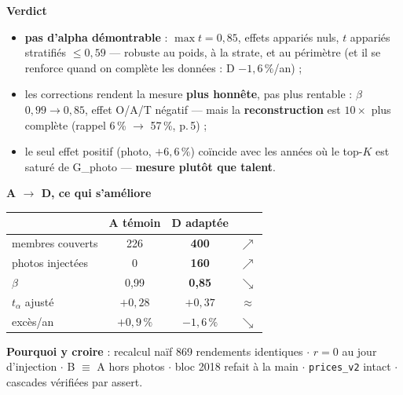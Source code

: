 \documentclass[10pt,a4paper,landscape]{article}
\begin{document}
\noindent\begin{minipage}[t]{0.47\textwidth}\vspace{0pt}
\textbf{\color{rouge}Verdict}
\begin{itemize}
\item[--] \textbf{pas d'alpha démontrable} : $\max t = 0{,}85$, effets appariés nuls, $t$ appariés stratifiés $\le 0{,}59$ --- robuste au poids, à la strate, et au périmètre (et il se renforce quand on complète les données : D $-1{,}6\,\%$/an) ;
\item[--] les corrections rendent la mesure \textbf{plus honnête}, pas plus rentable : $\beta$ $0{,}99 \to 0{,}85$, effet O/A/T négatif --- mais la \textbf{reconstruction} est $10\times$ plus complète (rappel 6\,\% $\to$ 57\,\%, p.\,5) ;
\item[--] le seul effet positif (photo, $+6{,}6\,\%$) coïncide avec les années où le top-$K$ est saturé de G\_photo --- \textbf{mesure plutôt que talent}.
\end{itemize}

\vspace{1mm}
\textbf{A $\to$ D, ce qui s'améliore}
\begin{center}\small
\begin{tabular}{@{}lccc@{}}
\toprule
 & A témoin & D adaptée & \\
\midrule
membres couverts & 226 & \textbf{400} & $\nearrow$ \\
photos injectées & 0 & \textbf{160} & $\nearrow$ \\
$\beta$ & 0,99 & \textbf{0,85} & $\searrow$ \\
$t_{\alpha}$ ajusté & $+0{,}28$ & $+0{,}37$ & $\approx$ \\
excès/an & $+0{,}9\,\%$ & $-1{,}6\,\%$ & $\searrow$ \\
\bottomrule
\end{tabular}
\end{center}

\vspace{1mm}
\textbf{\color{grisf}Pourquoi y croire} {\scriptsize : recalcul naïf 869 rendements identiques $\cdot$ $r = 0$ au jour d'injection $\cdot$ B $\equiv$ A hors photos $\cdot$ bloc 2018 refait à la main $\cdot$ \texttt{prices\_v2} intact $\cdot$ cascades vérifiées par assert.}
\end{minipage}\hfill
\end{document}
